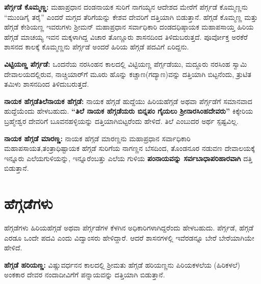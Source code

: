 \textbf{ಪೆರ್ಗ್ಗಡೆ ಕೊಮ್ಮಣ್ಣ:} ಮಹಾಪ್ರಧಾನ ದಂಡನಾಯಕ ಸುರಿಗೆ ನಾಗಯ್ಯನ ಆದೇಶದ ಮೇರೆಗೆ ಪೆರ್ಗ್ಗಡೆ ಕೊಮ್ಮಣ್ಣನು “ಮುಂಡಿಗೈ ತರೈ” ಎಂದರೆ ಮಗ್ಗದ ತೆರಿಗೆಯನ್ನು ಕೇಶವ ದೇವರಿಗೆ ದತ್ತಿಯಾಗಿ ಬಿಡುತ್ತಾನೆ. ಹೆಗ್ಗಡೆ ಕೊಮ್ಮಣ್ಣ ಮತ್ತು ಹೆಗ್ಗಡೆ ಕೇಶಿಯಣ್ಣ ಇವರುಗಳು ಶ‍್ರೀಮನ್​ ಮಹಾಪ್ರಧಾನ ಸರ್ವಾಧಿಕಾರಿ ದಂಡದಧಿಷ್ಠಾಯಕ ಮಹಾಪಸಾಯ್ತ ಹಿರಿಯ ಹೆಗ್ಗಡೆ ಮಾಚಯ್ಯ ಇವನ ಮಕ್ಕಳಾಗಿದ್ದ ವಿಚಾರ ತೊಣ್ಣೂರು ಶಾಸನದಿಂದ ತಿಳಿದುಬರುತ್ತದೆ. ಪೂರ್ವೋಕ್ತ ಅರಕೆರೆ ಶಾಸನದ ಕಾಲಕ್ಕೆ ಕೊಮ್ಮಣ್ಣನು ಪೆರ್ಗ್ಗಡೆ ಅಂದರೆ ಹಿರಿಯ ಹೆಗ್ಗಡೆ ಪದವಿಗೆ ಏರಿದ್ದನು.

\textbf{ವಿಟ್ಟಿಯಣ್ಣ ಪೆರ್ಗ್ಗಡೆ:} ಒಂದನೆಯ ನರಸಿಂಹನ ಕಾಲದಲ್ಲಿ ವಿಟ್ಟಿಯಣ್ಣ ಪೆರ್ಗ್ಗಡೆಯು, ಮದ್ದೂರು ನರಸಿಂಹ ಸ್ವಾಮಿ ದೇವಾಲಯದಲ್ಲಿರುವ, ನಾಚ್ಚಿಯಾರ್​ಗೆ ಮೂರು ಹೊನ್ನು ಕಚ್ಚಾಣ(ಗದ್ಯಾಣ)ವನ್ನು ದತ್ತಿಯಾಗಿ ಬಿಟ್ಟನೆಂದು, ತ್ರುಟಿತ ತಮಿಳು ಶಾಸನದಿಂದ ತಿಳಿದುಬರುತ್ತದೆ.

\textbf{ನಾಯಕ ಹೆಗ್ಗಡೆ\general{\enginline{-}}ತಿಲೆನಾಯಕ ಹೆಗ್ಗಡೆ:} ನಾಯಕ ಹೆಗ್ಗಡೆ ಹುದ್ದೆಯು ಹಿರಿಯಹೆಗ್ಗಡೆ ಅಥವಾ ಪೆರ್ಗ್ಗಡೆಗೆ ಸಮಾನವಾದ ಹುದ್ದೆಯೆಂದು ಹೇಳಬಹುದು. \textbf{“ತಿಲೆ ನಾಯಕ ಹೆಗ್ಗಡೆಯರು ಬಿನ್ನಪಂ ಗೈಯಲು ಶ‍್ರೀನಾರಸಿಂಹದೇವರು”} ಕಿಕ್ಕೇರಿಯ ಬ್ರಹ್ಮೇಶ್ವರ ದೇವರಿಗೆ ಬೂವನಹಳ್ಳಿಯನ್ನು ದತ್ತಿಯಾಗಿಬಿಟ್ಟರೆಂದು ಹೇಳಿದೆ. ತಿಲೆ ಎಂಬುದರ ಅರ್ಥ ಸ್ಪಷ್ಟವಿಲ್ಲ.

\textbf{ನಾಯಕ ಹೆಗ್ಗಡೆ ಮಾರಣ್ಣ:} ನಾಯಕ ಹೆಗ್ಗಡೆ ಮಾರಣ್ಣನು ಮಹಾಪ್ರಧಾನ ಸರ್ವಾಧಿಕಾರಿ ಮಹಾಪಸಾಯತ,\break ತಂತ್ರಾಧಿಷ್ಟಾಯಕ ಹೆಗ್ಗಡೆ ಸುರಿಗೆಯ ನಾಗಣ್ಣನ ಬೆಸದಿಂದ, ತೊಂಡನೂರ ನಡುವಣ ದೇವಾಲಯಕ್ಕೆ ಇನ್ನೂರು ಎಲೆಯಗುಳಿ\-ಯನ್ನು, ಇನ್ನೂರೆಂಬತ್ತು ಎಲೆಯ ಗುಳಿಯ \textbf{ಪಂನಾಯವನ್ನು ಸರ್ವಬಾಧಾಪರಿಹಾರವಾಗಿ} ದತ್ತಿ ಬಿಡುತ್ತಾನೆ.

\vskip -3pt

\section*{ಹೆಗ್ಗಡೆಗಳು}

ಹೆಗ್ಗಡೆಗಳು ಹಿರಿಯಹೆಗ್ಗಡೆ ಅಥವಾ ಪೆರ್ಗ್ಗಡೆಗಳ ಕೆಳಗಿನ ಅಧಿಕಾರಿಗಳಾಗಿದ್ದರೆಂದು ಹೇಳಬಹುದು. ಪೆರ್ಗ್ಗಡೆ, ಹೆಗ್ಗಡೆ ಎರಡೂ ಒಂದೇ ಪದವಿ ಎಂದು ವಿದ್ವಾಂಸರು ಹೇಳಿದ್ದಾರೆ. ಆದರೆ ಶಾಸನಗಳಲ್ಲಿ ಇವೆರಡನ್ನೂ ಬೇರೆ ಬೇರೆಯಾಗಿಯೇ ಹೇಳಿದೆ.

\textbf{ಹೆಗ್ಗಡೆ ಹರಿಯಣ್ಣ: }ವಿಷ್ಣುವರ್ಧನನ ಕಾಲದಲ್ಲಿ ಶ‍್ರೀಮತು ಹೆಗ್ಗಡೆ ಹರಿಯಣ್ಣನು ಪಿರಿಯಕಳಲೆಯ (ಹಿರಿಕಳಲೆ) ಅಂಕಕಾರ ದೇವರ ನಂದಾದೀವಿಗೆಗೆ ಪನ್ನಾಯವನ್ನು ದತ್ತಿಯಾಗಿ ಬಿಡುತ್ತಾನೆ.

